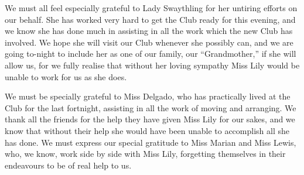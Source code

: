 We must all feel especially grateful to Lady Swaythling
for her untiring efforts on our behalf. She has worked
very hard to get the Club ready for this evening, and we
know she has done much in assisting in all the work which
the new Club has involved. We hope she will visit our
Club whenever she possibly can, and we are going to-night
to include her as one of our family, our “Grandmother,”
if she will allow us, for we fully realise that
without her loving sympathy Miss Lily would be unable
to work for us as she does.

We must be specially grateful to Miss Delgado, who
has practically lived at the Club for the last fortnight,
assisting in all the work of moving and arranging. We
thank all the friends for the help they have given Miss
Lily for our sakes, and we know that without their help
she would have been unable to accomplish all she has
done. We must express our special gratitude to Miss
Marian and Miss Lewis, who, we know, work side by
side with Miss Lily, forgetting themselves in their
endeavours to be of real help to us.
